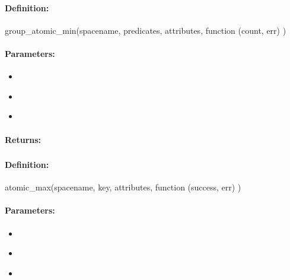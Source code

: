 \paragraph{Definition:}
\begin{javascriptcode}
group_atomic_min(spacename, predicates, attributes, function (count, err) {})
\end{javascriptcode}
\paragraph{Parameters:}
\begin{itemize}[noitemsep]
\item {}\\

\item {}\\

\item {}\\

\end{itemize}

\paragraph{Returns:}


\pagebreak
\subsubsection{}
\label{api:nodejs:atomic_max}


\paragraph{Definition:}
\begin{javascriptcode}
atomic_max(spacename, key, attributes, function (success, err) {})
\end{javascriptcode}
\paragraph{Parameters:}
\begin{itemize}[noitemsep]
\item {}\\

\item {}\\

\item {}\\

\end{itemize}

